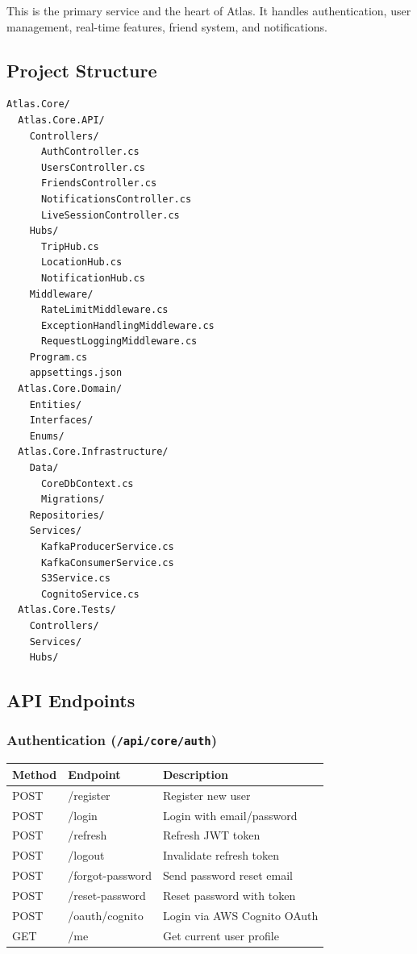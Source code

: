 \documentclass[12pt,letterpaper]{article}
\begin{document}
This is the primary service and the heart of Atlas. It handles authentication, user management, real-time features, friend system, and notifications.

\subsection{Project Structure}
\begin{lstlisting}[style=code]
Atlas.Core/
  Atlas.Core.API/
    Controllers/
      AuthController.cs
      UsersController.cs
      FriendsController.cs
      NotificationsController.cs
      LiveSessionController.cs
    Hubs/
      TripHub.cs
      LocationHub.cs
      NotificationHub.cs
    Middleware/
      RateLimitMiddleware.cs
      ExceptionHandlingMiddleware.cs
      RequestLoggingMiddleware.cs
    Program.cs
    appsettings.json
  Atlas.Core.Domain/
    Entities/
    Interfaces/
    Enums/
  Atlas.Core.Infrastructure/
    Data/
      CoreDbContext.cs
      Migrations/
    Repositories/
    Services/
      KafkaProducerService.cs
      KafkaConsumerService.cs
      S3Service.cs
      CognitoService.cs
  Atlas.Core.Tests/
    Controllers/
    Services/
    Hubs/
\end{lstlisting}

\subsection{API Endpoints}

\subsubsection{Authentication (\texttt{/api/core/auth})}
\begin{tabular}{|l|l|l|}
\hline
\textbf{Method} & \textbf{Endpoint} & \textbf{Description} \\
\hline
POST & /register & Register new user \\
POST & /login & Login with email/password \\
POST & /refresh & Refresh JWT token \\
POST & /logout & Invalidate refresh token \\
POST & /forgot-password & Send password reset email \\
POST & /reset-password & Reset password with token \\
POST & /oauth/cognito & Login via AWS Cognito OAuth \\
GET  & /me & Get current user profile \\
\hline
\end{tabular}
\end{document}
